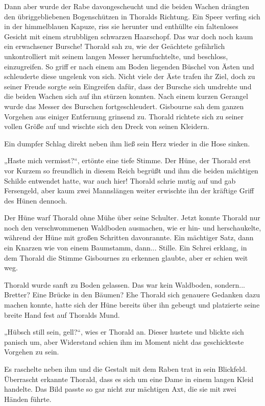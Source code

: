 Dann aber wurde der Rabe davongescheucht und die beiden Wachen drängten den übriggebliebenen Bogenschützen in Thoralds Richtung. Ein Speer verfing sich in der himmelblauen Kapuze, riss sie herunter und enthüllte ein faltenloses Gesicht mit einem strubbligen schwarzen Haarschopf. Das war doch noch kaum ein erwachsener Bursche! Thorald sah zu, wie der Geächtete gefährlich unkontrolliert mit seinem langen Messer herumfuchtelte, und beschloss, einzugreifen. So griff er nach einem am Boden liegenden Büschel von Ästen und schleuderte diese ungelenk von sich. Nicht viele der Äste trafen ihr Ziel, doch zu seiner Freude sorgte sein Eingreifen dafür, dass der Bursche sich umdrehte und die beiden Wachen sich auf ihn stürzen konnten. Nach einem kurzen Gerangel wurde das Messer des Burschen fortgeschleudert. Gisbourne sah dem ganzen Vorgehen aus einiger Entfernung grinsend zu. Thorald richtete sich zu seiner vollen Größe auf und wischte sich den Dreck von seinen Kleidern.

Ein dumpfer Schlag direkt neben ihm ließ sein Herz wieder in die Hose sinken.

„Haste mich vermisst?“, ertönte eine tiefe Stimme. Der Hüne, der Thorald erst vor Kurzem so freundlich in diesem Reich begrüßt und ihm die beiden mächtigen Schilde entwendet hatte, war auch hier! Thorald schrie mutig auf und gab Fersengeld, aber kaum zwei Mannslängen weiter erwischte ihn der kräftige Griff des Hünen dennoch.

Der Hüne warf Thorald ohne Mühe über seine Schulter. Jetzt konnte Thorald nur noch den verschwommenen Waldboden ausmachen, wie er hin- und herschaukelte, während der Hüne mit großen Schritten davonrannte. Ein mächtiger Satz, dann ein Knarzen wie von einem Baumstamm, dann... Stille. Ein Schrei erklang, in dem Thorald die Stimme Gisbournes zu erkennen glaubte, aber er schien weit weg.



\trennzeichen



Thorald wurde sanft zu Boden gelassen. Das war kein Waldboden, sondern... Bretter? Eine Brücke in den Bäumen? Ehe Thorald sich genauere Gedanken dazu machen konnte, hatte sich der Hüne bereits über ihn gebeugt und platzierte seine breite Hand fest auf Thoralds Mund.

„Hübsch still sein, gell?“, wies er Thorald an. Dieser hustete und blickte sich panisch um, aber Widerstand schien ihm im Moment nicht das geschickteste Vorgehen zu sein.

Es raschelte neben ihm und die Gestalt mit dem Raben trat in sein Blickfeld. Überrascht erkannte Thorald, dass es sich um eine Dame in einem langen Kleid handelte. Das Bild passte so gar nicht zur mächtigen Axt, die sie mit zwei Händen führte.

